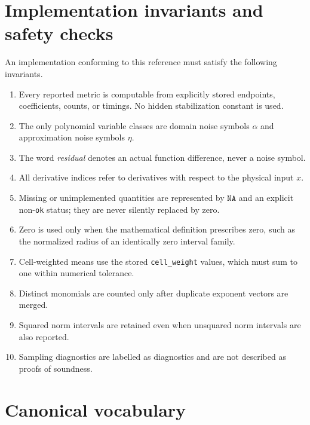 \documentclass[11pt]{article}
\newcommand{\NA}{\texttt{NA}}
\begin{document}
\section{Implementation invariants and safety checks}

An implementation conforming to this reference must satisfy the following
invariants.

\begin{enumerate}[label=\arabic*.]
 \item Every reported metric is computable from explicitly stored endpoints,
 coefficients, counts, or timings.  No hidden stabilization constant is used.
 \item The only polynomial variable classes are domain noise symbols \(\alpha\)
 and approximation noise symbols \(\eta\).
 \item The word \emph{residual} denotes an actual function difference, never a
 noise symbol.
 \item All derivative indices refer to derivatives with respect to the physical
 input \(x\).
 \item Missing or unimplemented quantities are represented by \(\NA\) and an
 explicit non-\texttt{ok} status; they are never silently replaced by zero.
 \item Zero is used only when the mathematical definition prescribes zero, such
 as the normalized radius of an identically zero interval family.
 \item Cell-weighted means use the stored \texttt{cell\_weight} values, which
 must sum to one within numerical tolerance.
 \item Distinct monomials are counted only after duplicate exponent vectors are
 merged.
 \item Squared norm intervals are retained even when unsquared norm intervals
 are also reported.
 \item Sampling diagnostics are labelled as diagnostics and are not described
 as proofs of soundness.
\end{enumerate}

\section{Canonical vocabulary}
\end{document}
